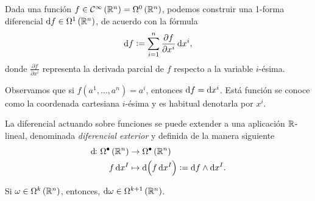 \begin{defi}
   Dada una función $f \in \mathcal{C}^\infty \left( \mathbb{R}^n \right) = \Omega^0 \left( \mathbb{R}^n \right)$, podemos construir una 1-forma diferencial
   $\dif f \in \Omega^1 \left( \real^n \right)$, de acuerdo con la fórmula
   \[
       \dif f := \sum^n_{i=1} \frac{\partial f}{\partial x^i} \dif x^i,
   \]
   donde $\frac{\partial f}{\partial x^i}$ representa la derivada parcial de $f$ respecto a la variable $i$-\'esima.
\end{defi}

\begin{obs}
    Observamos que si $f \left( a^1, \dots, a^n \right) = a^i$, entonces $\dif f = \dif x^i$. Está función se conoce como la coordenada
    cartesiana $i$-\'esima y es habitual denotarla por $x^i$.
\end{obs}

\begin{defi}
    La diferencial actuando sobre funciones se puede extender a una aplicación $\mathbb{R}$-lineal, denominada \emph{diferencial exterior} y definida
    de la manera siguiente
        \begin{align*}
            \dif \colon \Omega^\bullet \left( \real^n \right) &\to \Omega^\bullet \left( \real^n \right) \\
            f \dif x^I &\mapsto \dif\left( f \dif x^I \right) := \dif f \wedge \dif x^I.
        \end{align*}
\end{defi}

\begin{obs*}
    Si $\omega \in \Omega^k \left( \mathbb{R}^n \right)$, entonces, $\dif \omega \in \Omega^{k+1} \left( \real^n \right)$.
\end{obs*}

